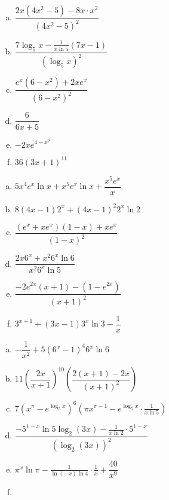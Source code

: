 \documentclass[11pt,letterpaper]{article}
\begin{document}
\begin{minipage}{0.5\textwidth}
\prob
\begin{enumerate}[(a)]
\item $\dfrac{2x(4x^2 - 5) - 8x \cdot x^2}{(4x^2 - 5)^2}$
\item $\dfrac{7 \log_5 x - \frac{1}{x \ln 5} (7x - 1)}{(\log_5 x)^2}$
\item $\dfrac{e^x (6 - x^2) + 2x e^x}{(6 - x^2)^2}$
\item $\dfrac{6}{6x + 5}$
\item $-2x e^{4 - x^2}$
\item $36 (3x + 1)^{11}$
\end{enumerate} \vfill

\prob
\begin{enumerate}[(a)]
\item $5x^4 e^x \ln x + x^5 e^x \ln x + \dfrac{x^5 e^x}{x}$
\item $8(4x - 1) 2^x + (4x - 1)^2 2^x \ln 2$
\item $\dfrac{(e^x + xe^x)(1 - x) + xe^x}{(1 - x)^2}$
\item $\dfrac{2x6^x + x^2 6^x \ln 6}{x^2 6^x \ln 5}$
\item $\dfrac{-2e^{2x} (x + 1) - (1 - e^{2x})}{(x + 1)^2}$
\item $3^{x+1} + (3x - 1) 3^x \ln 3 - \dfrac{1}{x}$
\end{enumerate} \vfill

\prob
\begin{enumerate}[(a)]
\item $-\dfrac{1}{x^2} + 5(6^x - 1)^4 6^x \ln 6$
\item $11 \left( \dfrac{2x}{x + 1} \right)^{10} \left( \dfrac{2(x + 1) - 2x}{(x + 1)^2} \right)$
\item $7 (x^\pi - e^{\log_5 x})^6 \left(\pi x^{\pi - 1} - e^{\log_5 x} \cdot \frac{1}{x \ln 5} \right)$
\item $\dfrac{-5^{1-x} \ln 5 \log_2(3x) - \frac{1}{x \ln 2} \cdot 5^{1-x}}{(\log_2(3x))^2}$
\item $\pi^x \ln \pi - \frac{1}{\ln(-x) \ln 4} \cdot \frac{1}{x} + \dfrac{40}{x^9}$
\item {}
\end{enumerate} \vfill
\end{minipage}
\end{document}
